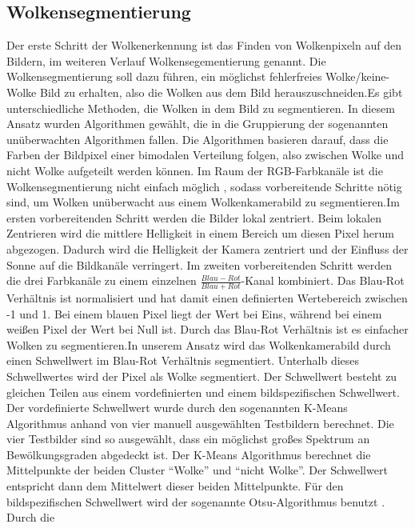 \documentclass[a4paper,11pt,twoside,german]{article}
\newcommand{\absatz}{\smallbreak}
\begin{document}
\subsection{Wolkensegmentierung}
Der erste Schritt der Wolkenerkennung ist das Finden von Wolkenpixeln auf den
Bildern, im weiteren Verlauf Wolkensegementierung genannt. Die
Wolkensegmentierung soll dazu führen, ein möglichst fehlerfreies
Wolke/keine-Wolke Bild zu erhalten, also die Wolken aus dem Bild
herauszuschneiden.\absatz Es gibt unterschiedliche Methoden, die Wolken in dem
Bild zu segmentieren. In diesem Ansatz wurden Algorithmen gewählt, die in
die Gruppierung der sogenannten unüberwachten Algorithmen fallen. Die
Algorithmen basieren darauf, dass die Farben der Bildpixel einer bimodalen
Verteilung folgen, also zwischen Wolke und nicht Wolke aufgeteilt werden können.
Im Raum der RGB-Farbkanäle ist die Wolkensegmentierung nicht einfach möglich
\citep{dev_14_color}, sodass vorbereitende Schritte nötig sind, um Wolken
unüberwacht aus einem Wolkenkamerabild zu segmentieren.\absatz Im ersten
vorbereitenden Schritt werden die Bilder lokal zentriert. Beim lokalen
Zentrieren wird die mittlere Helligkeit in einem Bereich um diesen Pixel herum
abgezogen. Dadurch wird die Helligkeit der Kamera zentriert und der Einfluss der
Sonne auf die Bildkanäle verringert. Im zweiten vorbereitenden Schritt werden
die drei Farbkanäle zu einem einzelnen $\frac{Blau-Rot}{Blau+Rot}$-Kanal
kombiniert. Das Blau-Rot Verhältnis ist normalisiert und hat damit einen
definierten Wertebereich zwischen -1 und 1. Bei einem blauen Pixel liegt der
Wert bei Eins, während bei einem weißen Pixel der Wert bei Null ist. Durch das
Blau-Rot Verhältnis ist es einfacher Wolken zu segmentieren.\absatz In unserem
Ansatz wird das Wolkenkamerabild durch einen Schwellwert im Blau-Rot Verhältnis
segmentiert. Unterhalb dieses Schwellwertes wird der Pixel als Wolke
segmentiert. Der Schwellwert besteht zu gleichen Teilen aus einem vordefinierten
und einem bildspezifischen Schwellwert. Der vordefinierte Schwellwert wurde
durch den sogenannten K-Means Algorithmus \citep{james_13_introduction} anhand
von vier manuell ausgewählten Testbildern berechnet. Die vier Testbilder sind so
ausgewählt, dass ein möglichst großes Spektrum an Bewölkungsgraden abgedeckt
ist. Der K-Means Algorithmus berechnet die Mittelpunkte der beiden Cluster
\enquote{Wolke} und \enquote{nicht Wolke}. Der Schwellwert entspricht dann dem
Mittelwert dieser beiden Mittelpunkte. Für den bildspezifischen Schwellwert wird
der sogenannte Otsu-Algorithmus benutzt \citep{otsu_75_threshold}. Durch die
\end{document}

